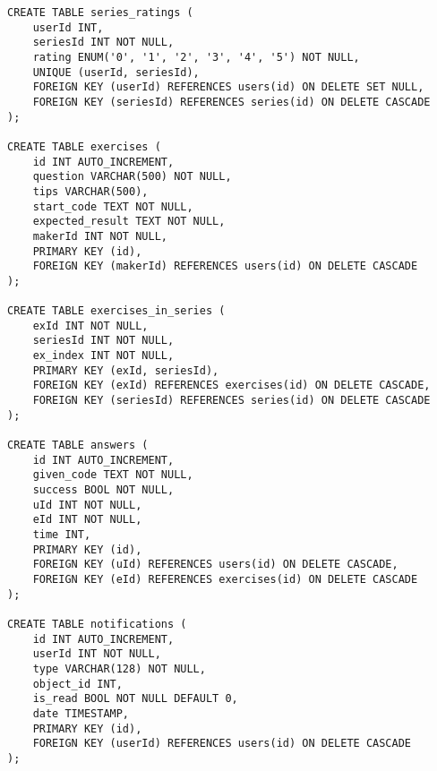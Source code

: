 \begin{lstlisting}
CREATE TABLE series_ratings (
    userId INT,
    seriesId INT NOT NULL,
    rating ENUM('0', '1', '2', '3', '4', '5') NOT NULL,
    UNIQUE (userId, seriesId),
    FOREIGN KEY (userId) REFERENCES users(id) ON DELETE SET NULL,
    FOREIGN KEY (seriesId) REFERENCES series(id) ON DELETE CASCADE
);

CREATE TABLE exercises (
    id INT AUTO_INCREMENT,
    question VARCHAR(500) NOT NULL,
    tips VARCHAR(500),
    start_code TEXT NOT NULL,
    expected_result TEXT NOT NULL,
    makerId INT NOT NULL,
    PRIMARY KEY (id),
    FOREIGN KEY (makerId) REFERENCES users(id) ON DELETE CASCADE
);

CREATE TABLE exercises_in_series (
    exId INT NOT NULL,
    seriesId INT NOT NULL,
    ex_index INT NOT NULL,
    PRIMARY KEY (exId, seriesId),
    FOREIGN KEY (exId) REFERENCES exercises(id) ON DELETE CASCADE,
    FOREIGN KEY (seriesId) REFERENCES series(id) ON DELETE CASCADE
);

CREATE TABLE answers (
    id INT AUTO_INCREMENT,
    given_code TEXT NOT NULL,
    success BOOL NOT NULL,
    uId INT NOT NULL,
    eId INT NOT NULL,
    time INT,
    PRIMARY KEY (id),
    FOREIGN KEY (uId) REFERENCES users(id) ON DELETE CASCADE,
    FOREIGN KEY (eId) REFERENCES exercises(id) ON DELETE CASCADE
);

CREATE TABLE notifications (
    id INT AUTO_INCREMENT,
    userId INT NOT NULL,
    type VARCHAR(128) NOT NULL,
    object_id INT,
    is_read BOOL NOT NULL DEFAULT 0,
    date TIMESTAMP,
    PRIMARY KEY (id),
    FOREIGN KEY (userId) REFERENCES users(id) ON DELETE CASCADE
);
\end{lstlisting}    
